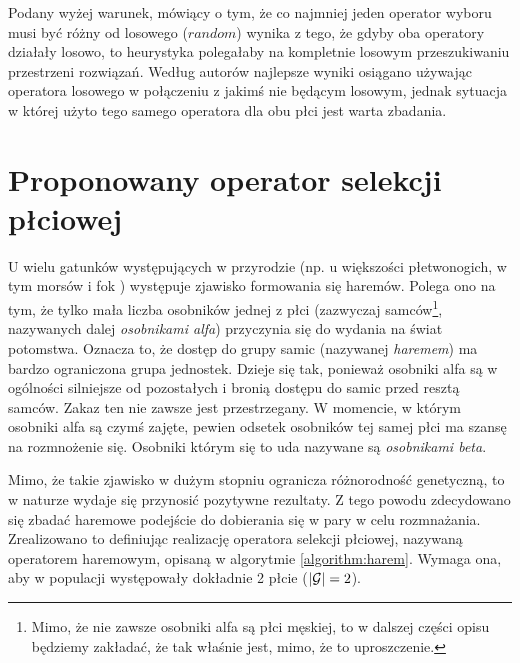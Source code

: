 \documentclass[./FM_mgr.tex]{subfiles}
\begin{document}
Podany wyżej warunek, mówiący o tym, że co najmniej jeden operator wyboru musi być różny od losowego ($random$) wynika z tego, że gdyby oba operatory działały losowo, to heurystyka polegałaby na kompletnie losowym przeszukiwaniu przestrzeni rozwiązań.
Według autorów najlepsze wyniki osiągano używając operatora losowego w połączeniu z jakimś nie będącym losowym, jednak sytuacja w której użyto tego samego operatora dla obu płci jest warta zbadania.

\section{Proponowany operator selekcji płciowej}

U wielu gatunków występujących w przyrodzie (np. u większości płetwonogich, w tym morsów i fok \cite{pletwonogiMajaHaremy}) występuje zjawisko formowania się haremów.
Polega ono na tym, że tylko mała liczba osobników jednej z płci (zazwyczaj samców\footnote{
	Mimo, że nie zawsze osobniki alfa są płci męskiej, to w dalszej części opisu będziemy zakładać, że tak właśnie jest, mimo, że to uproszczenie.
}, nazywanych dalej \emph{osobnikami alfa}) przyczynia się do wydania na świat potomstwa.
Oznacza to, że dostęp do grupy samic (nazywanej \emph{haremem}) ma bardzo ograniczona grupa jednostek.
Dzieje się tak, ponieważ osobniki alfa są w ogólności silniejsze od pozostałych i bronią dostępu do samic przed resztą samców.
Zakaz ten nie zawsze jest przestrzegany.
W momencie, w którym osobniki alfa są czymś zajęte, pewien odsetek osobników tej samej płci ma szansę na rozmnożenie się.
Osobniki którym się to uda nazywane są \emph{osobnikami beta}.

Mimo, że takie zjawisko w dużym stopniu ogranicza różnorodność genetyczną, to w naturze wydaje się przynosić pozytywne rezultaty.
Z tego powodu zdecydowano się zbadać haremowe podejście do dobierania się w pary w celu rozmnażania.
Zrealizowano to definiując realizację operatora selekcji płciowej, nazywaną operatorem haremowym, opisaną w algorytmie \ref{algorithm:harem}. Wymaga ona, aby w populacji występowały dokładnie 2 płcie ($|\mathcal{G}| = 2$).
\end{document}
